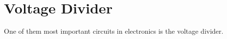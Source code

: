 \section{Voltage Divider}

One of them most important circuits in electronics is the voltage divider.
